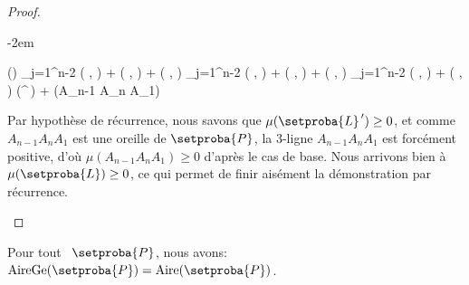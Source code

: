 \begin{proof}
\begin{itemize}
		\leavevmode\kern-2em%
		\begin{stepcalc}[style=ar*]
			\mu()
		\explnext{}
			\dsum_{j=1}^{n-2} \det \big(  ,   \big)
			+
			\det \big(  ,   \big)
			+
			\det \big(  ,   \big)
		          {}
			\dsum_{j=1}^{n-2} \det \big(  ,   \big)
			+
			\det \big(  ,   \big)
			+
			\det \big(  ,   \big)
		\explnext{}
			\dsum_{j=1}^{n-2} \det \big(  ,   \big)
			+
			\det \big(  ,   \big)
		          {}
			\mu(^{\,\prime})
			+
			\mu(A_{n-1} A_n A_1)
		\end{stepcalc}


		\noindent
		Par hypothèse de récurrence, nous savons que
		$\mu(\setproba{L}^{\,\prime}) \geq 0$, 
		et comme $A_{n-1} A_n A_1$ est une oreille de $\setproba{P}$, la $3$-ligne $A_{n-1} A_n A_1$ est forcément positive, d'où $\mu(A_{n-1} A_n A_1) \geq 0$ d'après le cas de base.
		Nous arrivons bien à $\mu(\setproba{L}) \geq 0$, ce qui permet de finir aisément la démonstration par récurrence.
	\end{itemize}
\end{proof}

    


\begin{fact} \label{ngone-garea-is-area}
    Pour tout \ngone\ $\setproba{P}$, nous avons: $\garea{\setproba{P}} = \area{\setproba{P}}$.
\end{fact}


